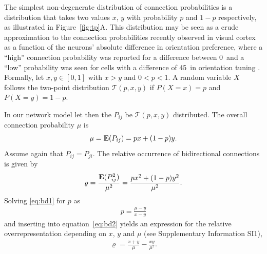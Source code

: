 
The simplest non-degenerate distribution of connection probabilities
is a distribution that takes two values $x$, $y$ with probability $p$
and $1-p$ respectively, as illustrated in Figure~\ref{fig:tp}A. %
%
This distribution may be seen as a crude approximation to the
connection probabilities recently observed in visual cortex as a
function of the neurons' absolute difference in orientation preference, where a \enquote{high} connection probability was reported for a difference between 0\textdegree\ and a \enquote{low} probability was seen for cells with a difference of 45\textdegree\ in orientation tuning \cite{Lee2016a}.
%
Formally, let $x,y \in [0,1]$ with $x > y$ and $0 < p
< 1$. A random variable $X$ follows the two-point distribution 
$\mathcal{T}(p,x,y)$ if $P(X=x)=p$ and $P(X=y) = 1-p$.
%

%
In our network model let then the $P_{ij}$ be $\mathcal{T}(p,x,y)$
distributed. The overall connection probability $\mu$ is
\begin{align}
\mu = \operatorname{\mathbf{E}}(P_{ij}) = px + (1-p)y. \label{eq:bd1}
\end{align}
Assume again that $P_{ij} = P_{ji}$. The relative occurrence of
bidirectional connections is given by
\begin{align}
  \varrho = \frac{\operatorname{\mathbf{E}}(P_{ij}^2)}{\mu^2} = \frac{p x^2 + (1-p) y^2}{\mu^2} \label{eq:bd2}.
\end{align}
Solving \eqref{eq:bd1} for $p$ as
\begin{align}
p = \frac{\mu - y}{x-y}
\end{align}
and inserting into equation~\eqref{eq:bd2} yields an expression for
the relative overrepresentation depending on $x$, $y$ and $\mu$ (see
Supplementary Information SI1),
\begin{align}
\varrho = \frac{x+y}{\mu} - \frac{xy}{\mu^2}.
\end{align}

